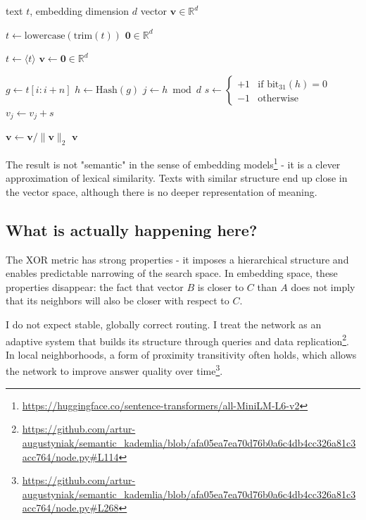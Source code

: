 \documentclass[twocolumn,9pt]{extarticle}
\begin{document}
\begin{algorithm}
\captionsetup{font=scriptsize}
\caption{Lexical embedding via CountSketch over character n-grams}
\label{alg:countsketch-embedding}
\begin{algorithmic}
\Require text $t$, embedding dimension $d$
\Ensure vector $\mathbf{v} \in \mathbb{R}^d$

\State $t \gets \text{lowercase}(\text{trim}(t))$
    \State \Return $\mathbf{0} \in \mathbb{R}^d$
\EndIf

\State $t \gets \langle t \rangle$
\State $\mathbf{v} \gets \mathbf{0} \in \mathbb{R}^d$

        \State $g \gets t[i : i+n]$
        \State $h \gets \text{Hash}(g)$
        \State $j \gets h \bmod d$
        \State $s \gets
        \begin{cases}
            +1 & \text{if } \mathrm{bit}_{31}(h) = 0 \\
            -1 & \text{otherwise}
        \end{cases}$
        \State $v_j \gets v_j + s$
    \EndFor
\EndFor

\State $\mathbf{v} \gets \mathbf{v} / \|\mathbf{v}\|_2$
\State \Return $\mathbf{v}$
\end{algorithmic}
\end{algorithm}

The result is not "semantic" in the sense of embedding models\footnote{\url{https://huggingface.co/sentence-transformers/all-MiniLM-L6-v2}} - it is a clever approximation of lexical similarity.
Texts with similar structure end up close in the vector space, although there is no deeper representation of meaning.

\subsection*{What is actually happening here?}

The XOR metric has strong properties - it imposes a hierarchical structure and enables predictable narrowing of the search space. 
In embedding space, these properties disappear: the fact that vector $B$ is closer to $C$ than $A$ does not imply that its neighbors will also be closer with respect to $C$. 

I do not expect stable, globally correct routing. I treat the network as an adaptive system that builds its structure through queries and data replication\footnote{\url{https://github.com/artur-augustyniak/semantic_kademlia/blob/afa05ea7ea70d76b0a6c4db4cc326a81c3acc764/node.py\#L114}}.
In local neighborhoods, a form of proximity transitivity often holds, which allows the network to improve answer quality over time\footnote{\url{https://github.com/artur-augustyniak/semantic_kademlia/blob/afa05ea7ea70d76b0a6c4db4cc326a81c3acc764/node.py\#L268}}.
\end{document}

